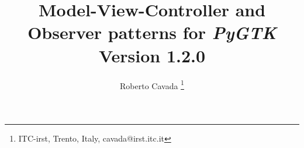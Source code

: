 \documentclass{article}
\newcommand{\appl}[1]{\textsl{#1}\xspace}
\newcommand{\pygtk}{\appl{PyGTK}}
\begin{document}
\title{Model-View-Controller and Observer patterns for \pygtk \\
Version 1.2.0}

\author{ Roberto Cavada \thanks{ITC-irst, Trento, Italy,
 cavada@irst.itc.it} }

\maketitle

\tableofcontents

\newpage



\newpage


\newpage


\newpage


\newpage


\newpage


\newpage


\newpage

\end{document}
